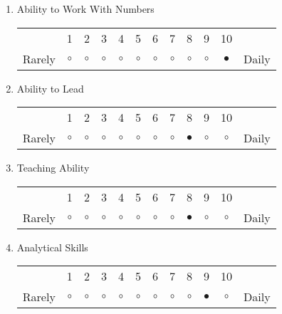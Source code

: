 \documentclass{article}
\begin{document}
\begin{enumerate}
\item Ability to Work With Numbers\\
\vspace{5pt}
\begin{tabular}{c c c c c c c c c c c c}
     & 1 & 2 & 3 & 4 & 5 & 6 & 7 & 8 & 9 & 10 & \\
    Rarely & $\circ$ & $\circ$ & $\circ$ & $\circ$ & $\circ$ & $\circ$ & $\circ$ & $\circ$ & $\circ$ & $\bullet$ & Daily \\ 
\end{tabular}

\item Ability to Lead\\
\vspace{5pt}
\begin{tabular}{c c c c c c c c c c c c}
     & 1 & 2 & 3 & 4 & 5 & 6 & 7 & 8 & 9 & 10 & \\
    Rarely & $\circ$ & $\circ$ & $\circ$ & $\circ$ & $\circ$ & $\circ$ & $\circ$ & $\bullet$ & $\circ$ & $\circ$ & Daily \\ 
\end{tabular}

\item Teaching Ability\\
\vspace{5pt}
\begin{tabular}{c c c c c c c c c c c c}
     & 1 & 2 & 3 & 4 & 5 & 6 & 7 & 8 & 9 & 10 & \\
    Rarely & $\circ$ & $\circ$ & $\circ$ & $\circ$ & $\circ$ & $\circ$ & $\circ$ & $\bullet$ & $\circ$ & $\circ$ & Daily \\ 
\end{tabular}

\item Analytical Skills\\
\vspace{5pt}
\begin{tabular}{c c c c c c c c c c c c}
     & 1 & 2 & 3 & 4 & 5 & 6 & 7 & 8 & 9 & 10 & \\
    Rarely & $\circ$ & $\circ$ & $\circ$ & $\circ$ & $\circ$ & $\circ$ & $\circ$ & $\circ$ & $\bullet$ & $\circ$ & Daily \\ 
\end{tabular}


\end{enumerate}
\end{document}
